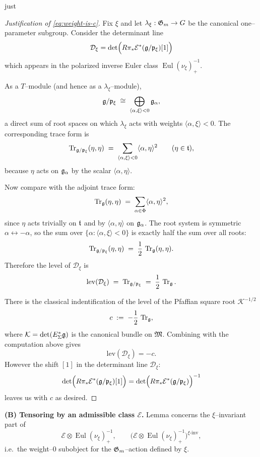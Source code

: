 just \documentclass[12pt]{article}
\DeclareMathOperator{\Eul}{Eul}
\begin{document}
\begin{proof}[Justification of \eqref{eq:weight-is-c}]
Fix $\xi$ and let $\lambda_\xi:\mathfrak{G}_m\to G$ be the canonical one--parameter subgroup.
Consider the determinant line
\[
\mathcal D_\xi = \det \Bigl(R\pi_*\mathcal E^*(\mathfrak{g}/\mathfrak{p}_\xi)[1]\Bigr)
\]
which appears in the polarized inverse Euler class $\Eul(\nu_\xi)^{-1}_+$.

As a $T$--module (and hence as a $\lambda_\xi$--module),
\[
\mathfrak{g}/\mathfrak{p}_\xi\;\cong\;\bigoplus_{\langle\alpha,\xi\rangle<0}\mathfrak{g}_\alpha,
\]
a direct sum of root spaces on which $\lambda_\xi$ acts with weights
$\langle\alpha,\xi\rangle<0$.
The corresponding trace form is
\[
\operatorname{Tr}_{\mathfrak{g}/\mathfrak{p}_\xi}(\eta,\eta)
\;=\;\sum_{\langle\alpha,\xi\rangle<0}\langle\alpha,\eta\rangle^2
\qquad (\eta\in \mathfrak{t}),
\]
because $\eta$ acts on $\mathfrak{g}_\alpha$ by the scalar $\langle\alpha,\eta\rangle$.

Now compare with the adjoint trace form:
\[
\operatorname{Tr}_{\mathfrak{g}}(\eta,\eta)\;=\;\sum_{\alpha\in \Phi}\langle\alpha,\eta\rangle^2,
\]
since $\eta$ acts trivially on $\mathfrak{t}$ and by $\langle\alpha,\eta\rangle$ on $\mathfrak{g}_\alpha$.
The root system is symmetric $\alpha\leftrightarrow -\alpha$, so the sum over
$\{\alpha:\langle\alpha,\xi\rangle<0\}$ is exactly half the sum over all roots:
\[
\operatorname{Tr}_{\mathfrak{g}/\mathfrak{p}_\xi}(\eta,\eta)\;=\;\frac12\,\operatorname{Tr}_{\mathfrak{g}}(\eta,\eta).
\]
Therefore the level of $\mathcal D_\xi$ is
\[
\mathrm{lev}(\mathcal D_\xi)
\;=\;\operatorname{Tr}_{\mathfrak{g}/\mathfrak{p}_\xi}
\;=\;\frac12\,\operatorname{Tr}_{\mathfrak{g}}.
\]

There is the classical indentification of the level of the Pfaffian square root $\mathcal K^{-1/2}$
\[
c\;:=\;-\frac12\,\operatorname{Tr}_{\mathfrak{g}},
\]
where $\mathcal K=\det(E_\Sigma^*\mathfrak{g})$ is the canonical bundle on $\mathfrak{M}$.
Combining with the computation above gives
\[
\mathrm{lev}(\mathcal D_\xi) = -c.
\]
However the shift $[1]$ in the determinant line $\mathcal D_\xi$: \begin{align*}
    \det \Bigl(R\pi_*\mathcal E^*(\mathfrak{g}/\mathfrak{p}_\xi)[1]\Bigr) = \det \Bigl(R\pi_*\mathcal E^*(\mathfrak{g}/\mathfrak{p}_\xi)\Bigr)^{-1}
\end{align*} leaves us with $c$ as desired.
\end{proof}

\medskip
\noindent\textbf{(B) Tensoring by an admissible class $\mathcal E$.}
Lemma \cite[\S1.11]{TelemanWoodward} concerns the $\xi$--invariant part of
\[
\mathcal E\otimes \Eul(\nu_\xi)^{-1}_+,
\qquad
\bigl(\mathcal E\otimes \Eul(\nu_\xi)^{-1}_+\bigr)^{\xi\text{-inv}},
\]
i.e.\ the weight--$0$ subobject for the $\mathfrak{G}_m$--action defined by $\xi$.
\end{document}

